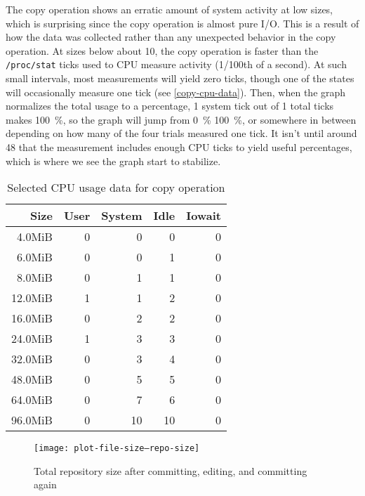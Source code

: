 The copy operation shows an erratic amount of system activity at low sizes,
which is surprising since the copy operation is almost pure I/O. This is a
result of how the data was collected rather than any unexpected behavior in the
copy operation. At sizes below about \SI{10}{\mib}, the copy operation is faster
than the \lstinline{/proc/stat} ticks used to CPU measure activity
(\num{1/100}{th} of a second\cite{proc_man_page}). At such small intervals, most
measurements will yield zero ticks, though one of the states will occasionally
measure one tick (see \autoref{copy-cpu-data}). Then, when the graph normalizes
the total usage to a percentage, \num{1} system tick out of \num{1} total ticks
makes \SI{100}{\percent}, so the graph will jump from \SI{0}{\percent}
\SI{100}{\percent}, or somewhere in between depending on how many of the four
trials measured one tick. It isn't until around \SI{48}{\mib} that the
measurement includes enough CPU ticks to yield useful percentages, which is
where we see the graph start to stabilize.


\begin{table}[hp]
    \caption{Selected CPU usage data for copy operation}
    \label{copy-cpu-data}

    \centering
    \begin{tabular}{r r r r r}
        Size & User & System & Idle & Iowait \\
        \midrule
  4.0MiB &    0    &      0    &      0    &      0 \\
  6.0MiB &    0    &      0    &      1    &      0 \\
  8.0MiB &    0    &      1    &      1    &      0 \\
 12.0MiB &    1    &      1    &      2    &      0 \\
 16.0MiB &    0    &      2    &      2    &      0 \\
 24.0MiB &    1    &      3    &      3    &      0 \\
 32.0MiB &    0    &      3    &      4    &      0 \\
 48.0MiB &    0    &      5    &      5    &      0 \\
 64.0MiB &    0    &      7    &      6    &      0 \\
 96.0MiB &    0    &     10    &     10    &      0 \\
    \end{tabular}
\end{table}

%


\begin{figure}[p]
        \caption{Total repository size after committing, editing, and committing again}
        \label{fig:plot-file-size--repo-size}
        \centering

        \explaindiskspaceplot

        \texttt{[image: plot-file-size--repo-size]}
\end{figure}

